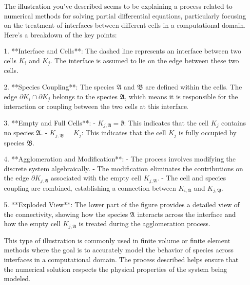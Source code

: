 The illustration you've described seems to be explaining a process related to numerical methods for solving partial differential equations, particularly focusing on the treatment of interfaces between different cells in a computational domain. Here's a breakdown of the key points:

1. **Interface and Cells**: The dashed line represents an interface between two cells \( K_i \) and \( K_j \). The interface is assumed to lie on the edge between these two cells.

2. **Species Coupling**: The species \(\mathfrak{A}\) and \(\mathfrak{B}\) are defined within the cells. The edge \(\partial K_i \cap \partial K_j\) belongs to the species \(\mathfrak{A}\), which means it is responsible for the interaction or coupling between the two cells at this interface.

3. **Empty and Full Cells**: 
   - \( K_{j,\mathfrak{A}} = \emptyset \): This indicates that the cell \( K_j \) contains no species \(\mathfrak{A}\).
   - \( K_{j,\mathfrak{B}} = K_j \): This indicates that the cell \( K_j \) is fully occupied by species \(\mathfrak{B}\).

4. **Agglomeration and Modification**:
   - The process involves modifying the discrete system algebraically.
   - The modification eliminates the contributions on the edge \(\partial K_{j,\mathfrak{A}}\) associated with the empty cell \( K_{j,\mathfrak{A}} \).
   - The cell and species coupling are combined, establishing a connection between \( K_{i,\mathfrak{A}} \) and \( K_{j,\mathfrak{B}} \).

5. **Exploded View**: The lower part of the figure provides a detailed view of the connectivity, showing how the species \(\mathfrak{A}\) interacts across the interface and how the empty cell \( K_{j,\mathfrak{A}} \) is treated during the agglomeration process.

This type of illustration is commonly used in finite volume or finite element methods where the goal is to accurately model the behavior of species across interfaces in a computational domain. The process described helps ensure that the numerical solution respects the physical properties of the system being modeled.